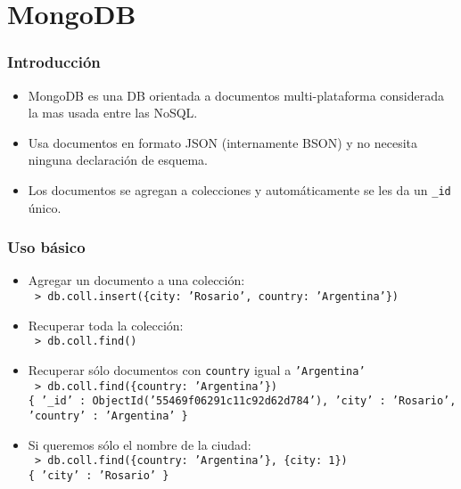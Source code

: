 \section{MongoDB}

\begin{frame}
\frametitle{Introducción}
\begin{itemize}

\item	MongoDB es una DB orientada a documentos multi-plataforma
	considerada la mas usada entre las NoSQL.
	\pause

\item	Usa documentos en formato JSON (internamente BSON) y no necesita
	ninguna declaración de esquema.
	\pause

\item	Los documentos se agregan a colecciones y automáticamente se les
	da un \texttt{\_id} único.
\end{itemize}
\end{frame}

\begin{frame}
\frametitle{Uso básico}
\begin{itemize}

\item	Agregar un documento a una colección: \\
	\texttt{\footnotesize
		> db.coll.insert(\{city: 'Rosario', country: 'Argentina'\})
	}
	\pause

\item	Recuperar toda la colección: \\
	\texttt{\footnotesize
		> db.coll.find()
	}
	\pause

\item	Recuperar sólo documentos con \texttt{country} igual a
	\texttt{'Argentina'} \\
	\texttt{\footnotesize
		> db.coll.find(\{country: 'Argentina'\}) \\
		\{ '\_id' : ObjectId('55469f06291c11c92d62d784'), 'city' : 'Rosario', 'country' : 'Argentina' \}
	}
	\pause

\item	Si queremos sólo el nombre de la ciudad: \\
	\texttt{\footnotesize
		> db.coll.find(\{country: 'Argentina'\}, \{city: 1\}) \\
		\{ 'city' : 'Rosario' \}
	}

\end{itemize}
\end{frame}
